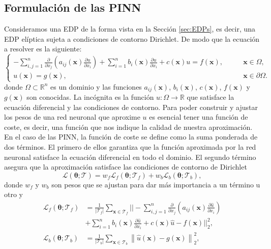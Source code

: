 \documentclass[a4paper,11pt,spanish, twoside, leqno]{tfg-uam}
\theoremstyle{definition}
\begin{document}
\subsection{Formulación de las PINN}
Consideramos una EDP de la forma vista en la Sección \ref{sec:EDPs}, es decir, una EDP elíptica sujeta a condiciones de contorno Dirichlet. De modo que la ecuación a resolver es la siguiente: 
\begin{equation} 
    \begin{cases} -\sum_{i,j=1}^{n} \frac{\partial}{\partial x_j}\left( a_{ij}(\mathbf{x})\frac{\partial u}{\partial x_i}\right) + \sum_{i=1}^{n} b_i(\mathbf{x})\frac{\partial u}{\partial x_i} + c(\mathbf{x})u = f(\mathbf{x}), &\qquad \mathbf{x}\in\Omega,\\ u(\mathbf{x}) = g(\mathbf{x}), &\qquad \mathbf{x}\in\partial\Omega. 
    \end{cases} 
\end{equation} 
donde $\Omega \subset \mathbb{R}^n$ es un dominio y las funciones $a_{ij}(\mathbf{x})$, $b_i(\mathbf{x})$, $c(\mathbf{x})$, $f(\mathbf{x})$ y $g(\mathbf{x})$ son conocidas. La incógnita es la función $u: \Omega \to \mathbb{R}$ que satisface la ecuación diferencial y las condiciones de contorno. Para poder construir y ajustar los pesos de una red neuronal que aproxime $u$ es esencial tener una función de coste, es decir, una función que nos indique la calidad de nuestra aproximación. En el caso de las PINN, la función de coste se define como la suma ponderada de dos términos. El primero de ellos garantiza que la función aproximada por la red neuronal satisface la ecuación diferencial en todo el dominio. El segundo término asegura que la aproximación satisface las condiciones de contorno de Dirichlet
\begin{equation} \label{eq:L_PINN}
    \mathcal{L}(\boldsymbol{\theta}; \mathcal{T}) = w_f \mathcal{L}_f(\boldsymbol{\theta}; \mathcal{T}_f) + w_b \mathcal{L}_b(\boldsymbol{\theta}; \mathcal{T}_b),
\end{equation}
donde $w_f$ y $w_b$ son pesos que se ajustan para dar más importancia a un término u otro y
\begin{equation}
    \label{eq:Lf_Lb}
    \begin{split}
        \mathcal{L}_f(\boldsymbol{\theta}; \mathcal{T}_f) &= \frac{1}{|\mathcal{T}_f|} \sum_{\mathbf{x} \in \mathcal{T}_f} || -\sum_{i,j=1}^{n} \frac{\partial}{\partial x_j}\left( a_{ij}(\mathbf{x})\frac{\partial \hat{u}}{\partial x_i}\right) \\ &+ \sum_{i=1}^{n} b_i(\mathbf{x})\frac{\partial \hat{u}}{\partial x_i} + c(\mathbf{x})\hat{u} - f(\mathbf{x}) ||_2^2, \\ 
        \mathcal{L}_b(\boldsymbol{\theta}; \mathcal{T}_b) &= \frac{1}{|\mathcal{T}_b|} \sum_{\mathbf{x} \in \mathcal{T}_b} \left\| \hat{u} (\mathbf{x}) - g(\mathbf{x})\right\|_2^2,
    \end{split}
\end{equation}
    
\end{document}
